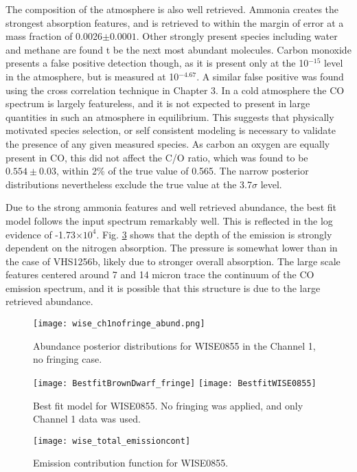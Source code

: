 The composition of the atmosphere is also well retrieved.
Ammonia creates the strongest absorption features, and is retrieved to within the margin of error at a mass fraction of 0.0026$\pm0.0001$.
Other strongly present species including water and methane are found t be the next most abundant molecules.
Carbon monoxide presents a false positive detection though, as it is present only at the 10$^{-15}$ level in the atmosphere, but is measured at 10$^{-4.67}$.
A similar false positive was found using the cross correlation technique in Chapter 3.
In a cold atmosphere the CO spectrum is largely featureless, and it is not expected to present in large quantities in such an atmosphere in equilibrium.
This suggests that physically motivated species selection, or self consistent modeling is necessary to validate the presence of any given measured species.
As carbon an oxygen are equally present in CO, this did not affect the C/O ratio, which was found to be $0.554\pm0.03$, within 2\% of the true value of 0.565.
The narrow posterior distributions nevertheless exclude the true value at the 3.7$\sigma$ level.

Due to the strong ammonia features and well retrieved abundance, the best fit model follows the input spectrum remarkably well.
This is reflected in the log evidence of -1.73$\times10^{4}$.
Fig. \ref{fig:WISEemcont} shows that the depth of the emission is strongly dependent on the nitrogen absorption. 
The pressure is somewhat lower than in the case of VHS1256b, likely due to stronger overall absorption. 
The large scale features centered around 7 and 14 micron trace the continuum of the CO emission spectrum, and it is possible that this structure is due to the large retrieved abundance.
\begin{figure}[h]
	\texttt{[image: wise\_ch1nofringe\_abund.png]}
	\caption{Abundance posterior distributions for WISE0855 in the Channel 1, no fringing case.}
	\label{fig:postWISEabund}
\end{figure}
\begin{figure}[h]
	\texttt{[image: BestfitBrownDwarf\_fringe]}
	\texttt{[image: BestfitWISE0855]}
	\caption{Best fit model for WISE0855. No fringing was applied, and only Channel 1 data was used.}
	\label{fig:bestfitWISE}
\end{figure}
\begin{figure}[h]
	\texttt{[image: wise\_total\_emissioncont]}
	\caption{Emission contribution function for WISE0855.}
	\label{fig:WISEemcont}
\end{figure}
\clearpage


